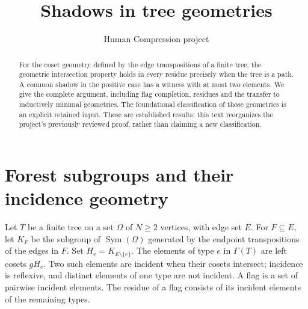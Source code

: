 \documentclass[11pt,a4paper]{article}
\title{Shadows in tree geometries}
\author{Human Compression project}\date{}
\newcommand{\Sym}{\operatorname{Sym}}
\begin{document}
\maketitle
\begin{abstract}
For the coset geometry defined by the edge transpositions of a finite tree,
the geometric intersection property holds in every residue precisely when
the tree is a path. A common shadow in the positive case has a witness with
at most two elements. We give the complete argument, including flag
completion, residues and the transfer to inductively minimal geometries.
The foundational classification of those geometries is an explicit retained
input. These are established results; this text reorganizes the project's
previously reviewed proof, rather than claiming a new classification.
\end{abstract}

\section{Forest subgroups and their incidence geometry}
Let $T$ be a finite tree on a set $\Omega$ of $N\geq2$ vertices, with edge
set $E$. For $F\subseteq E$, let $K_F$ be the subgroup of $\Sym(\Omega)$
generated by the endpoint transpositions of the edges in $F$. Set
$H_e=K_{E\setminus\{e\}}$. The elements of type $e$ in $\Gamma(T)$ are
left cosets $gH_e$. Two such elements are incident when their cosets
intersect; incidence is reflexive, and distinct elements of one type are
not incident. A flag is a set of pairwise incident elements. The residue
of a flag consists of its incident elements of the remaining types.
\end{document}
